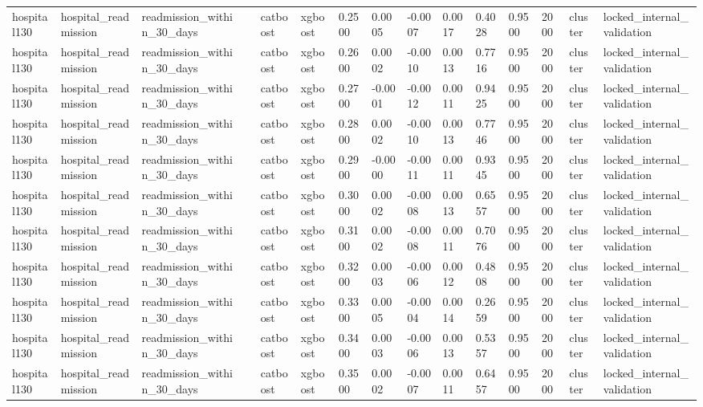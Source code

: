 \begin{tabular}{lllllllllllllll}
hospital130 & hospital\_readmission & readmission\_within\_30\_days &  & catboost & xgboost & 0.2500 & 0.0005 & -0.0007 & 0.0017 & 0.4028 & 0.9500 & 2000 & cluster & locked\_internal\_validation \\
hospital130 & hospital\_readmission & readmission\_within\_30\_days &  & catboost & xgboost & 0.2600 & 0.0002 & -0.0010 & 0.0013 & 0.7716 & 0.9500 & 2000 & cluster & locked\_internal\_validation \\
hospital130 & hospital\_readmission & readmission\_within\_30\_days &  & catboost & xgboost & 0.2700 & -0.0001 & -0.0012 & 0.0011 & 0.9425 & 0.9500 & 2000 & cluster & locked\_internal\_validation \\
hospital130 & hospital\_readmission & readmission\_within\_30\_days &  & catboost & xgboost & 0.2800 & 0.0002 & -0.0010 & 0.0013 & 0.7746 & 0.9500 & 2000 & cluster & locked\_internal\_validation \\
hospital130 & hospital\_readmission & readmission\_within\_30\_days &  & catboost & xgboost & 0.2900 & -0.0000 & -0.0011 & 0.0011 & 0.9345 & 0.9500 & 2000 & cluster & locked\_internal\_validation \\
hospital130 & hospital\_readmission & readmission\_within\_30\_days &  & catboost & xgboost & 0.3000 & 0.0002 & -0.0008 & 0.0013 & 0.6557 & 0.9500 & 2000 & cluster & locked\_internal\_validation \\
hospital130 & hospital\_readmission & readmission\_within\_30\_days &  & catboost & xgboost & 0.3100 & 0.0002 & -0.0008 & 0.0011 & 0.7076 & 0.9500 & 2000 & cluster & locked\_internal\_validation \\
hospital130 & hospital\_readmission & readmission\_within\_30\_days &  & catboost & xgboost & 0.3200 & 0.0003 & -0.0006 & 0.0012 & 0.4808 & 0.9500 & 2000 & cluster & locked\_internal\_validation \\
hospital130 & hospital\_readmission & readmission\_within\_30\_days &  & catboost & xgboost & 0.3300 & 0.0005 & -0.0004 & 0.0014 & 0.2659 & 0.9500 & 2000 & cluster & locked\_internal\_validation \\
hospital130 & hospital\_readmission & readmission\_within\_30\_days &  & catboost & xgboost & 0.3400 & 0.0003 & -0.0006 & 0.0013 & 0.5357 & 0.9500 & 2000 & cluster & locked\_internal\_validation \\
hospital130 & hospital\_readmission & readmission\_within\_30\_days &  & catboost & xgboost & 0.3500 & 0.0002 & -0.0007 & 0.0011 & 0.6457 & 0.9500 & 2000 & cluster & locked\_internal\_validation \\

\end{tabular}
